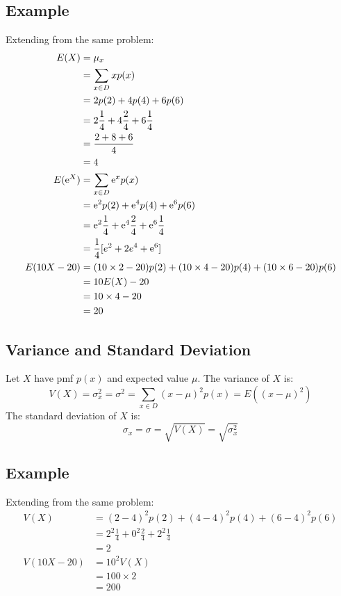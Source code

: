 \documentclass[letterpaper, 12pt]{math}
\begin{document}
\subsection*{Example}
Extending from the same problem:
\begin{align*}
  E(X) &= \mu_{x} \\
  &= \sum_{x\in D}xp(x) \\
  &= 2p(2)+4p(4)+6p(6) \\
  &= 2\frac{1}{4}+4\frac{2}{4}+6\frac{1}{4} \\
  &= \frac{2+8+6}{4} \\
  &= 4 \\
  E(\mathrm{e}^{X}) &= \sum_{x\in D}\mathrm{e}^{x}p(x) \\
  &= \mathrm{e}^{2}p(2)+\mathrm{e}^{4}p(4)+\mathrm{e}^{6}p(6) \\
  &= \mathrm{e}^{2}\frac{1}{4}+\mathrm{e}^{4}\frac{2}{4}+\mathrm{e}^{6}\frac{1}{4} \\
  &= \frac{1}{4}[e^{2}+2e^{4}+\mathrm{e}^{6}] \\
  E(10X-20) &= (10\times2-20)p(2)+(10\times4-20)p(4)+(10\times6-20)p(6) \\
  &= 10E(X)-20 \\
  &= 10\times4-20 \\
  &= 20
\end{align*}

\subsection*{Variance and Standard Deviation}
Let \( X \) have pmf \( p(x) \) and expected value \( \mu \). The variance of
\( X \) is:
\[ V(X) = \sigma_{x}^{2} = \sigma^{2} = \sum_{x\in D}(x-\mu)^{2}p(x) =
   E((x-\mu)^{2}) \]
The standard deviation of \( X \) is:
\[ \sigma_{x} = \sigma = \sqrt{V(X)} = \sqrt{\sigma_{x}^{2}} \]

\subsection*{Example}
Extending from the same problem:
\begin{align*}
  V(X) &= (2-4)^{2}p(2)+(4-4)^{2}p(4)+(6-4)^{2}p(6) \\
  &= 2^{2}\frac{1}{4}+0^{2}\frac{2}{4}+2^{2}\frac{1}{4} \\
  &= 2 \\
  V(10X-20) &= 10^{2}V(X) \\
  &= 100\times2 \\
  &= 200
\end{align*}
\end{document}
